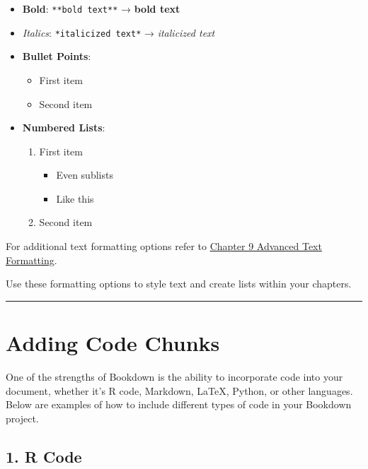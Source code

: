 \documentclass[
]{book}
\providecommand{\tightlist}{%
  \setlength{\itemsep}{0pt}\setlength{\parskip}{0pt}}
\theoremstyle{definition}
\theoremstyle{definition}
\theoremstyle{definition}
\theoremstyle{definition}
\theoremstyle{remark}
\begin{document}
\begin{itemize}
\tightlist
\item
  \textbf{Bold}: \texttt{**bold\ text**} → \textbf{bold text}
\item
  \emph{Italics}: \texttt{*italicized\ text*} → \emph{italicized text}
\item
  \textbf{Bullet Points}:

  \begin{itemize}
  \tightlist
  \item
    First item
  \item
    Second item
  \end{itemize}
\item
  \textbf{Numbered Lists}:

  \begin{enumerate}
  \def\labelenumi{\arabic{enumi}.}
  \tightlist
  \item
    First item

    \begin{itemize}
    \tightlist
    \item
      Even sublists
    \item
      Like this
    \end{itemize}
  \item
    Second item
  \end{enumerate}
\end{itemize}

For additional text formatting options refer to \hyperref[markdown-advanced]{Chapter 9 Advanced Text Formatting}.

Use these formatting options to style text and create lists within your chapters.

\begin{center}\rule{0.5\linewidth}{0.5pt}\end{center}

\section{Adding Code Chunks}\label{adding-code-chunks}

One of the strengths of Bookdown is the ability to incorporate code into your document, whether it's R code, Markdown, LaTeX, Python, or other languages. Below are examples of how to include different types of code in your Bookdown project.

\subsection{1. R Code}\label{r-code}
\end{document}
